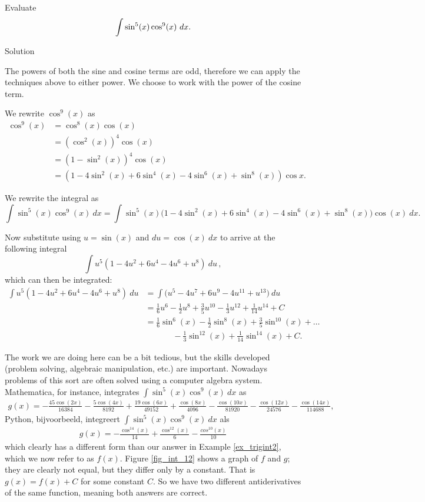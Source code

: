 \begin{example}\label{ex_trigint2}
Evaluate $$\displaystyle \int\sin^5(x)\cos^9(x)\ dx.$$

Solution 

The powers of both the sine and cosine terms are odd, therefore we can apply the techniques above to either power. We choose to work with the power of the cosine term.

We rewrite $\cos^9(x)$ as
\begin{align*} \cos^9(x) &= \cos^8(x)\cos(x) \\
				&= (\cos^2(x))^4\cos(x) \\
				&= (1-\sin^2(x))^4\cos(x) \\
				&= (1-4\sin^2(x)+6\sin^4(x)-4\sin^6(x)+\sin^8(x))\cos x.
\end{align*}

We rewrite the integral as 
$$\int\sin^5(x)\cos^9(x)\ dx = \int\sin^5(x)\big(1-4\sin^2(x)+6\sin^4(x)-4\sin^6(x)+\sin^8(x)\big)\cos(x)\ dx.$$

Now substitute using $u = \sin(x) $ and $du = \cos(x)\ dx$ to arrive at the following integral
$$  \int u^5(1-4u^2+6u^4-4u^6+u^8)\ du\,,$$
which can then be integrated:
\begin{align*} 
 \int u^5(1-4u^2+6u^4-4u^6+u^8)\ du &= \int\big(u^5-4u^7+6u^9-4u^{11}+u^{13}\big)\ du \\
				&= \frac16u^6-\frac12u^8+\frac35u^{10}-\frac13u^{12}+\frac{1}{14}u^{14}+C\\
				&= \frac16\sin^6(x)-\frac12\sin^8(x)+\frac35\sin^{10}(x)+\ldots\\
				&\phantom{=} \qquad -\frac13\sin^{12}(x)+\frac{1}{14}\sin^{14}(x)+C.
\end{align*}
\vspace{-0.5cm}
\end{example}

The work we are doing here can be a bit tedious, but the skills developed (problem solving, algebraic manipulation, etc.) are important. Nowadays problems of this sort are often solved using a computer algebra system. 
\ifmathematica
Mathematica, for instance, integrates $\int \sin^5(x)\cos^9(x)\ dx$ as 
\begin{multline*}
g(x)=-\frac{45 \cos (2 x)}{16384}-\frac{5 \cos (4 x)}{8192}+\frac{19 \cos (6
   x)}{49152}+\frac{\cos (8 x)}{4096}-\frac{\cos (10 x)}{81920}-\frac{\cos (12
   x)}{24576}-\frac{\cos (14 x)}{114688},
	\end{multline*}
\fi
\ifpython
Python, bijvoorbeeld, integreert $\int \sin^5(x)\cos^9(x)\ dx$ als 
\begin{multline*}
g(x)=-\frac{\cos^14(x)}{14} + \frac{\cos^12(x)}{6} - \frac{cos^10(x)}{10}
	\end{multline*}
\fi
which clearly has a different form than our answer in Example \ref{ex_trigint2}, which we now refer to as $f(x)$. Figure \ref{fig_int_12} shows a graph of $f$ and $g$; they are clearly not equal, but they differ only by a constant. That is $g(x) = f(x) + C$ for some constant $C$. So we have two different antiderivatives of the same function, meaning both answers are correct. 


